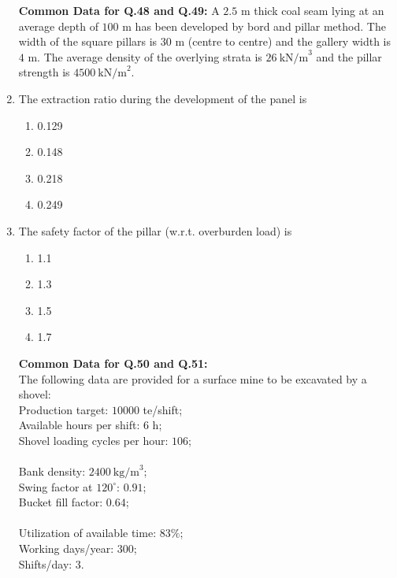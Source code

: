 \documentclass[journal]{IEEEtran}
\begin{document}
\begin{enumerate}[leftmargin=0pt]
\noindent\textbf{Common Data for Q.48 and Q.49:}
A $2.5$ m thick coal seam lying at an average depth of $100$ m has been developed by bord and pillar method.
The width of the square pillars is $30$ m (centre to centre) and the gallery width is $4$ m.
The average density of the overlying strata is $26~\text{kN/m}^3$ and the pillar strength is $4500~\text{kN/m}^2$.

\item The extraction ratio during the development of the panel is
\begin{multicols}{2}
\begin{enumerate}[label=(\Alph*), itemsep=0pt, topsep=2pt]
  \item 0.129
  \item 0.148
  \item 0.218
  \item 0.249
\end{enumerate}
\end{multicols}
\hfill{}

\item The safety factor of the pillar (w.r.t. overburden load) is
\begin{multicols}{2}
\begin{enumerate}[label=(\Alph*), itemsep=0pt, topsep=2pt]
  \item 1.1
  \item 1.3
  \item 1.5
  \item 1.7
\end{enumerate}
\end{multicols}
\hfill{}

\noindent\textbf{Common Data for Q.50 and Q.51:}\\[0.5em] The following data are provided for a surface mine to be excavated by a shovel:\\[0.5em]
Production target: $10000$ te/shift;\\[0.5em] \; Available hours per shift: $6$ h;\\[0.5em] \; Shovel loading cycles per hour: $106$;\\[0.5em]\\
Bank density: $2400~\text{kg/m}^3$;\\[0.5em] \; Swing factor at $120^\circ$: $0.91$;\\[0.5em] \; Bucket fill factor: $0.64$;\\[0.5em]\\
Utilization of available time: $83\%$;\\[0.5em] \; Working days/year: $300$;\\[0.5em] \; Shifts/day: $3$.\\[0.5em]


\end{enumerate}
\end{document}
